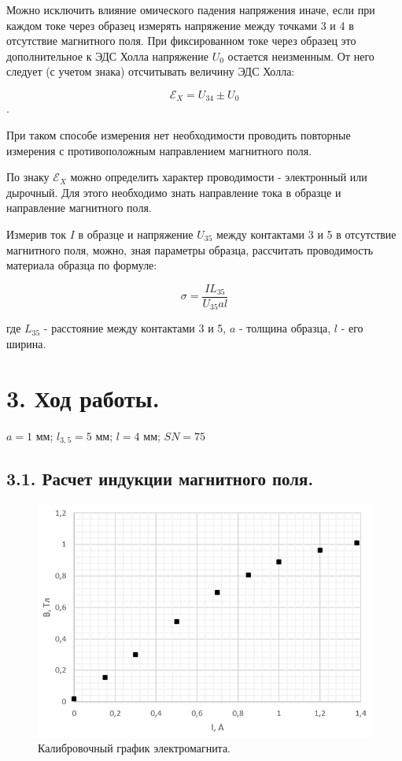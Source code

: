\documentclass[a4paper,12pt]{article}
\begin{document}
  	Можно исключить влияние омического падения напряжения иначе, если при каждом токе через образец измерять напряжение между точками 3 и 4 в отсутствие магнитного поля. При фиксированном токе через образец это дополнительное к ЭДС Холла напряжение $U_{0}$ остается неизменным. От него следует (с учетом
  	знака) отсчитывать величину ЭДС Холла: 
  	
  	$$\mathscr{E}_{X} = U_{34} \pm U_{0}$$. 
  	
  	При таком способе измерения нет необходимости проводить повторные измерения с противоположным направлением магнитного поля.
  	
  	
  	По знаку $\mathscr{E}_{X}$ можно определить характер проводимости - электронный или дырочный. Для этого необходимо знать направление тока в образце и направление
  	магнитного поля.
  	
  	Измерив ток $I$ в образце и напряжение $U_{35}$ между контактами 3 и 5 в отсутствие магнитного поля, можно, зная параметры образца, рассчитать проводимость материала образца по формуле:
  	
  \begin{equation}\label{sigma}
  	\sigma=\dfrac{IL_{35}}{U_{35}al}
  \end{equation}
  	
  	где $L_{35}$ - расстояние между контактами 3 и 5, $a$ - толщина образца, $l$ - его ширина.
   
\section*{3. Ход работы.}

$a = 1$ мм; $l_{3,5} = 5$ мм; $l = 4$ мм; $SN = 75$ 

\subsection*{3.1. Расчет индукции магнитного поля.}
\newpage
\begin{figure}[h]
    \includegraphics[scale=0.5]{1.png}
    \centering
    \caption*{Калибровочный график электромагнита.}
\end{figure}
\end{document}
